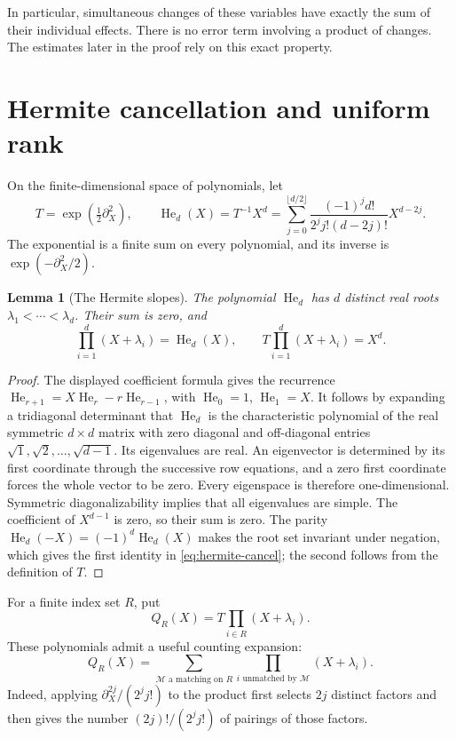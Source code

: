 \documentclass[11pt,a4paper]{article}
\newtheorem{lemma}[theorem]{Lemma}
\theoremstyle{definition}
\newcommand{\He}{\operatorname{He}}
\begin{document}
In particular, simultaneous changes of these variables have exactly the
sum of their individual effects. There is no error term involving a
product of changes. The estimates later in the proof rely on this exact
property.

\section{Hermite cancellation and uniform rank}\label{sec:hermite}

On the finite-dimensional space of polynomials, let
\[
 T=\exp\!\left(\tfrac12\partial_X^2\right),\qquad
 \He_d(X)=T^{-1}X^d
 =\sum_{j=0}^{\lfloor d/2\rfloor}
 \frac{(-1)^j d!}{2^j j!(d-2j)!}X^{d-2j}.
\]
The exponential is a finite sum on every polynomial, and its inverse is
$\exp(-\partial_X^2/2)$.

\begin{lemma}[The Hermite slopes]\label{lem:hermite}
The polynomial $\He_d$ has $d$ distinct real roots
$\lambda_1<\cdots<\lambda_d$. Their sum is zero, and
\begin{equation}\label{eq:hermite-cancel}
 \prod_{i=1}^d(X+\lambda_i)=\He_d(X),\qquad
 T\prod_{i=1}^d(X+\lambda_i)=X^d.
\end{equation}
\end{lemma}
\begin{proof}
The displayed coefficient formula gives the recurrence
$\He_{r+1}=X\He_r-r\He_{r-1}$, with $\He_0=1$, $\He_1=X$.
It follows by expanding a tridiagonal determinant that $\He_d$ is the
characteristic polynomial of the real symmetric $d\times d$ matrix with
zero diagonal and off-diagonal entries $\sqrt{1},\sqrt{2},\ldots,
\sqrt{d-1}$. Its eigenvalues are real. An eigenvector is determined by
its first coordinate through the successive row equations, and a zero
first coordinate forces the whole vector to be zero. Every eigenspace
is therefore one-dimensional. Symmetric diagonalizability implies that
all eigenvalues are simple.
The coefficient of $X^{d-1}$ is zero, so their sum is zero. The parity
$\He_d(-X)=(-1)^d\He_d(X)$ makes the root set invariant under negation,
which gives the first identity in \eqref{eq:hermite-cancel}; the second
follows from the definition of $T$.
\end{proof}

For a finite index set $R$, put
\begin{equation}\label{eq:leading-Q}
 Q_R(X)=T\prod_{i\in R}(X+\lambda_i).
\end{equation}
These polynomials admit a useful counting expansion:
\begin{equation}\label{eq:heat-matching}
 Q_R(X)=\sum_{\mathcal M\text{ a matching on }R}
             \prod_{i\text{ unmatched by }\mathcal M}(X+\lambda_i).
\end{equation}
Indeed, applying $\partial_X^{2j}/(2^j j!)$ to the product first selects
$2j$ distinct factors and then gives the number
$(2j)!/(2^j j!)$ of pairings of those factors.
\end{document}
